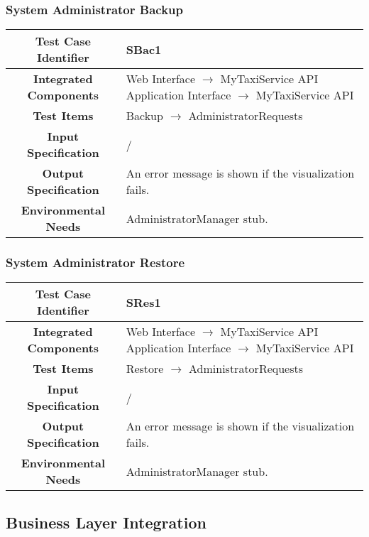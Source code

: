 \documentclass[11pt, a4paper,titlepage]{article}
\begin{document}
	\subsubsection{System Administrator Backup}
	\begin{tabularx}{\textwidth}{| c|X|}
		\hline \textbf{Test Case Identifier} & \label{SBac1}SBac1 \\
		\hline \textbf{Integrated Components} & Web Interface $\rightarrow $ MyTaxiService API \newline 
		Application Interface $\rightarrow $ MyTaxiService API \\
		\hline \textbf{Test Items} & Backup $\rightarrow $ AdministratorRequests \\
		\hline \textbf{Input Specification} & / \\
		\hline \textbf{Output Specification} & An error message is shown if the visualization fails. \\
		\hline \textbf{Environmental Needs} & AdministratorManager stub. \\
		\hline
	\end{tabularx}
	\newline
	\newline
	\subsubsection{System Administrator Restore}
	\begin{tabularx}{\textwidth}{| c|X|}
		\hline \textbf{Test Case Identifier} & \label{SRes1}SRes1 \\
		\hline \textbf{Integrated Components} & Web Interface $\rightarrow $ MyTaxiService API \newline 
		Application Interface $\rightarrow $ MyTaxiService API \\
		\hline \textbf{Test Items} & Restore $\rightarrow $ AdministratorRequests \\
		\hline \textbf{Input Specification} & / \\
		\hline \textbf{Output Specification} & An error message is shown if the visualization fails. \\
		\hline \textbf{Environmental Needs} & AdministratorManager stub. \\
		\hline
	\end{tabularx}
	\subsection{Business Layer Integration}
\end{document}
